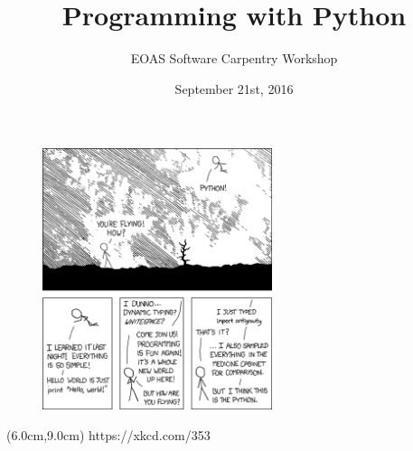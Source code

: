 \documentclass{beamer}
\title[Python Lesson]{Programming with Python}
\subtitle[]{EOAS Software Carpentry Workshop }
\date[Sep 2016]{September 21st, 2016}
\begin{document}






\begin{frame}[plain]

\titlepage


\end{frame}




\begin{frame}

\begin{figure}[htbp]
   \centering
  \includegraphics[width=0.6\textwidth]{figs_slides/python_xkcd.png}
\end{figure}

\begin{textblock*}{7cm}(6.0cm,9.0cm)
		\centering
			\tiny{https://xkcd.com/353 }
\end{textblock*}



\end{frame}
\end{document}
